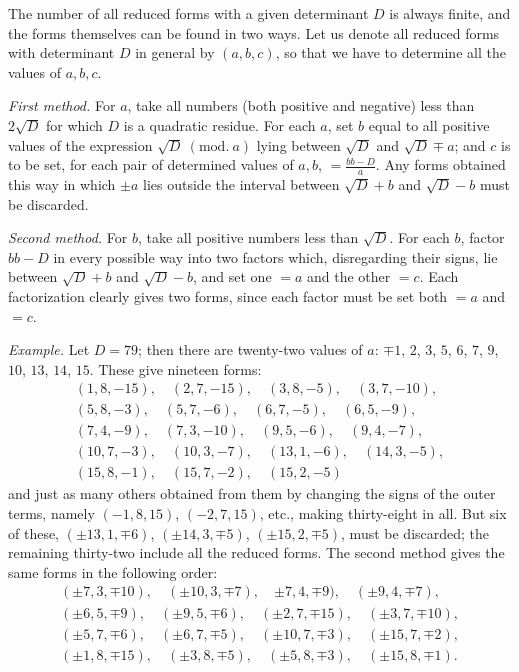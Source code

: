 The number of all reduced forms with a given determinant $D$ is always finite, and the forms themselves can be found in two ways. Let us denote all reduced forms with determinant $D$ in general by $(a,b,c)$, so that we have to determine all the values of $a,b,c$.

\textit{First method.} For $a$, take all numbers (both positive and negative) less than $2\surd D$ for which $D$ is a quadratic residue. For each $a$, set $b$ equal to all positive values of the expression $\surd D\ (\mathrm{mod.}\ a)$ lying between $\surd D$ and $\surd D\mp a$; and $c$ is to be set, for each pair of determined values of $a,b$, $=\frac{bb-D}{a}$. Any forms obtained this way in which $\pm a$ lies outside the interval between $\surd D+b$ and $\surd D-b$ must be discarded.

\textit{Second method.} For $b$, take all positive numbers less than $\surd D$. For each $b$, factor $bb-D$ in every possible way into two factors which, disregarding their signs, lie between $\surd D+b$ and $\surd D-b$, and set one $=a$ and the other $=c$. Each factorization clearly gives two forms, since each factor must be set both $=a$ and $=c$.
\par
{}
\textit{Example.} Let $D=79$; then there are twenty-two values of $a$: ${\mp1}$, $2$, $3$, $5$, $6$, $7$, $9$, $10$, $13$, $14$, $15$. These give nineteen forms:
\[
\begin{gathered}
(1,8,-15),\quad (2,7,-15),\quad {(3,8,-5)},\quad (3,7,-10),\\
(5,8,-3),\quad (5,7,-6),\quad (6,7,-5),\quad (6,5,-9),\\
(7,4,-9),\quad (7,3,-10),\quad (9,5,-6),\quad (9,4,-7),\\
(10,7,-3),\quad (10,3,-7),\quad (13,1,-6),\quad (14,3,-5),\\
(15,8,-1),\quad (15,7,-2),\quad (15,2,-5)
\end{gathered}
\]
and just as many others obtained from them by changing the signs of the outer terms, namely $(-1,8,15)$, $(-2,7,15)$, etc., making thirty-eight in all. But six of these, $(\pm13,1,\mp6)$, $(\pm14,3,\mp5)$, $(\pm15,2,\mp5)$, must be discarded; the remaining thirty-two include all the reduced forms. The second method gives the same forms in the following order:
\[
\begin{gathered}
(\pm7,3,\mp10),\quad (\pm10,3,\mp7),\quad {\pm7,4,\mp9)},\quad (\pm9,4,\mp7),\\
(\pm6,5,\mp9),\quad (\pm9,5,\mp6),\quad (\pm2,7,\mp15),\quad (\pm3,7,\mp10),\\
(\pm5,7,\mp6),\quad (\pm6,7,\mp5),\quad (\pm10,7,\mp3),\quad (\pm15,7,\mp2),\\
(\pm1,8,\mp15),\quad (\pm3,8,\mp5),\quad (\pm5,8,\mp3),\quad (\pm15,8,\mp1).
\end{gathered}
\]

